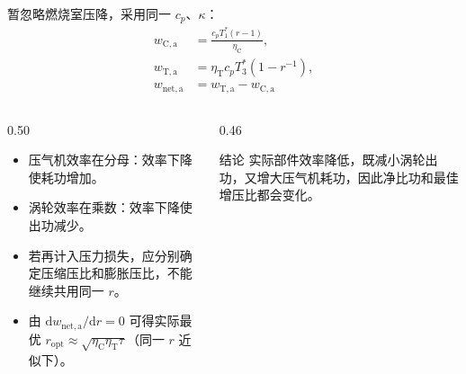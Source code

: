 \begin{frame}[t,shrink]{}
暂忽略燃烧室压降，采用同一 \(c_p\)、\(\kappa\)：
$$
\begin{aligned}
w_{\mathrm{C,a}}&=\frac{c_pT_1^*\left(r-1\right)}{\eta_{\mathrm{C}}},\\
w_{\mathrm{T,a}}&=\eta_{\mathrm{T}}c_pT_3^*\left(1-r^{-1}\right),\\
w_{\mathrm{net,a}}&=w_{\mathrm{T,a}}-w_{\mathrm{C,a}}
\end{aligned}
$$
\begin{columns}[T,onlytextwidth]
\begin{column}{0.50\textwidth}
  \begin{itemize}
    \item 压气机效率在分母：效率下降使耗功增加。
    \item 涡轮效率在乘数：效率下降使出功减少。
    \item 若再计入压力损失，应分别确定压缩压比和膨胀压比，不能继续共用同一 \(r\)。
    \item 由 \(\mathrm{d}w_{\mathrm{net,a}}/\mathrm{d}r=0\) 可得实际最优 \(r_{\mathrm{opt}}\approx\sqrt{\eta_{\mathrm{C}}\eta_{\mathrm{T}}\tau}\)（同一 \(r\) 近似下）。
  \end{itemize}
\end{column}
\begin{column}{0.46\textwidth}
  \begin{keybox}{结论}
  \small 实际部件效率降低，既减小涡轮出功，又增大压气机耗功，因此净比功和最佳增压比都会变化。
  \end{keybox}
\end{column}
\end{columns}
\end{frame}
